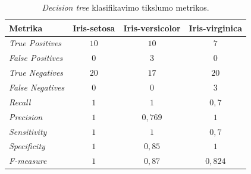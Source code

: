 \begin{table}[H]
    \centering
    \caption{\textit{Decision tree} klasifikavimo tikslumo metrikos.}
    \begin{tabular}{|l|c|c|c|}
        \hline
        \textbf{Metrika} & \textbf{Iris-setosa} & \textbf{Iris-versicolor} & \textbf{Iris-virginica} \\
        \hline
        \textit{True Positives}   & $10$  & $10$  & $7$ \\ \hline
        \textit{False Positives}  & $0$  & $3$   & $0$  \\ \hline
        \textit{True Negatives}   & $20$ & $17$  & $20$ \\ \hline
        \textit{False Negatives}  & $0$  & $0$   & $3$  \\ \hline
        \textit{Recall}           & $1$  & $1$       & $0{,}7$ \\ \hline
        \textit{Precision}        & $1$  & $0{,}769$ & $1$ \\ \hline
        \textit{Sensitivity}      & $1$  & $1$       & $0{,}7$ \\ \hline
        \textit{Specificity}      & $1$  & $0{,}85$ & $1$ \\ \hline
        \textit{F-measure}        & $1$  & $0{,}87$ & $0{,}824$ \\ \hline
    \end{tabular}
    \label{tab:decision_tree_klasifikavimo_metrikos}
\end{table}